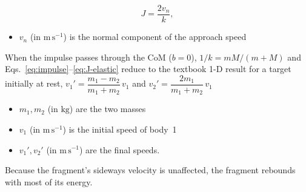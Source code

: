 \begin{equation}
  J=\frac{2v_n}{k},
  \label{eq:J-elastic}
\end{equation}

\begin{itemize}
  \item $v_n$ (in $\mathrm{m\,s^{-1}}$) is the normal component of the approach
speed
\end{itemize}
When the impulse passes through the CoM
($b=0$), $1/k=mM/(m+M)$ and
Eqs.~\eqref{eq:impulse}--\eqref{eq:J-elastic} reduce to the textbook 1-D result
for a target initially at rest,
$v_1'=\dfrac{m_1-m_2}{m_1+m_2}\,v_1$ and
$v_2'=\dfrac{2m_1}{m_1+m_2}\,v_1$ \citep{ling2016}

\begin{itemize}
  \item $m_1,m_2$ (in $\mathrm{kg}$) are the two masses
  \item $v_1$ (in $\mathrm{m\,s^{-1}}$) is the initial
speed of body~1
  \item $v_1',v_2'$ (in $\mathrm{m\,s^{-1}}$) are the final speeds.
\end{itemize}
Because the fragment's sideways velocity is unaffected, the
fragment rebounds with most of its energy.